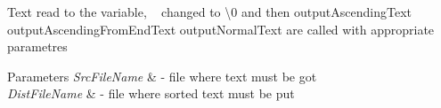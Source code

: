 Text read to the variable, ~\newline
 changed to \textbackslash{}0 and then output\+Ascending\+Text output\+Ascending\+From\+End\+Text output\+Normal\+Text are called with appropriate parametres 
\begin{DoxyParams}{Parameters}
{\em Src\+File\+Name} & -\/ file where text must be got \\
\hline
{\em Dist\+File\+Name} & -\/ file where sorted text must be put \\
\hline
\end{DoxyParams}
